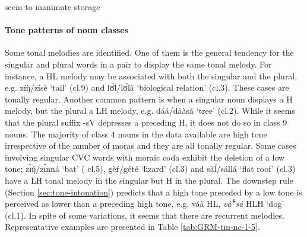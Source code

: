 \begin{exe}
\begin{exe}
\begin{exe}
{\begin{exe}
\begin{exe}
\begin{exe}
\begin{exe}
seem to 
inanimate 
storage 
% 

\paragraph{Tone patterns of noun classes}
\label{sec:GRM-tone-p}

Some tonal melodies are identified. One of them is the  general tendency for
the singular and  plural words in a pair to display the same tonal melody. For
instance, a HL melody may be associated with both the singular and the plural,
e.g.  {\sls zíŋ̀}/{\sls zísè} `tail' ({\sc cl.9}) 
and   {\sls lʊ́l̀}/{\sls lʊ́là} `biological relation'  ({\sc cl.3}). These 
cases 
are tonally regular. 
Another common pattern is when a singular noun displays a H melody, but the
plural a LH melody, e.g.  {\sls dáá}/{\sls dààsá} `tree' ({\sc cl.2}). 
While 
it
 seems that  the
plural suffix -{\sls sV}  depresses a preceding H,  it does not do so in class 9
nouns.
The majority of class 4 nouns in the data available are high tone irrespective
of the number of moras and they are all tonally regular. Some cases involving
singular CVC words with moraic
coda exhibit the deletion of a low tone;  {\sls zɪ̀ŋ́}/{\sls zɪ́nná} `bat' 
({\sc 
cl.5}),   {\sls gèŕ}/{\sls gété} `lizard' ({\sc cl.3}) and
{\sls sàĺ}/{\sls sállá} `flat roof' ({\sc cl.3})  have a LH tonal melody in 
the
singular but  H in the plural. The downstep rule (Section
\ref{sec:tone-intonation})  predicts that a high tone preceded by a low tone is
perceived as lower than a preceding high
tone, e.g. {\sls váà}  {HL},  {\it vá{\T ꜜ}sá}  {HLH}  `dog' 
({\sc cl.1}).  
In
spite of some variations,  it seems that there are recurrent
melodies. Representative examples are presented in
Table \ref{tab:GRM-tm-nc-1-5}.
 


\end{exe}
\end{exe}
\end{exe}
\end{exe}}
\end{exe}
\end{exe}
\end{exe}
